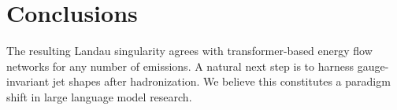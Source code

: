 \section{Conclusions}\label{sec:conclusions}

The resulting Landau singularity agrees with transformer-based energy
flow networks for any number of emissions. A natural next step is to
harness gauge-invariant jet shapes after hadronization. We believe this
constitutes a paradigm shift in large language model research.


